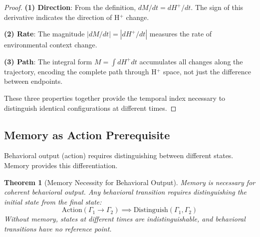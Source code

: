 \documentclass[aps,prd,twocolumn,superscriptaddress,floatfix,nofootinbib]{revtex4-2}
\newtheorem{theorem}{Theorem}[section]
\theoremstyle{remark}
\begin{document}
\begin{proof}
\textbf{(1) Direction}: From the definition, $dM/dt = dH^+/dt$. The sign of this derivative indicates the direction of H$^+$ change.

\textbf{(2) Rate}: The magnitude $|dM/dt| = |dH^+/dt|$ measures the rate of environmental context change.

\textbf{(3) Path}: The integral form $M = \int dH^+ dt$ accumulates all changes along the trajectory, encoding the complete path through H$^+$ space, not just the difference between endpoints.

These three properties together provide the temporal index necessary to distinguish identical configurations at different times.
\end{proof}

\subsection{Memory as Action Prerequisite}

Behavioral output (action) requires distinguishing between different states. Memory provides this differentiation.

\begin{theorem}[Memory Necessity for Behavioral Output]
\label{thm:memory_action}
Memory is necessary for coherent behavioral output. Any behavioral transition requires distinguishing the initial state from the final state:
\begin{equation}
\text{Action}(\Gamma_1 \to \Gamma_2) \implies \text{Distinguish}(\Gamma_1, \Gamma_2)
\end{equation}
Without memory, states at different times are indistinguishable, and behavioral transitions have no reference point.
\end{theorem}
\end{document}
